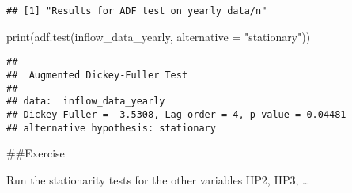 \documentclass[
]{article}
\newenvironment{Shaded}{\begin{snugshade}}{\end{snugshade}}
\newcommand{\AttributeTok}[1]{\textcolor[rgb]{0.77,0.63,0.00}{#1}}
\newcommand{\FunctionTok}[1]{\textcolor[rgb]{0.00,0.00,0.00}{#1}}
\newcommand{\NormalTok}[1]{#1}
\newcommand{\StringTok}[1]{\textcolor[rgb]{0.31,0.60,0.02}{#1}}
\begin{document}
\begin{verbatim}
## [1] "Results for ADF test on yearly data/n"
\end{verbatim}

\begin{Shaded}
\begin{Highlighting}[]
\FunctionTok{print}\NormalTok{(}\FunctionTok{adf.test}\NormalTok{(inflow\_data\_yearly, }\AttributeTok{alternative =} \StringTok{"stationary"}\NormalTok{))}
\end{Highlighting}
\end{Shaded}

\begin{verbatim}
## 
##  Augmented Dickey-Fuller Test
## 
## data:  inflow_data_yearly
## Dickey-Fuller = -3.5308, Lag order = 4, p-value = 0.04481
## alternative hypothesis: stationary
\end{verbatim}

\#\#Exercise

Run the stationarity tests for the other variables HP2, HP3, \ldots{}
\end{document}

